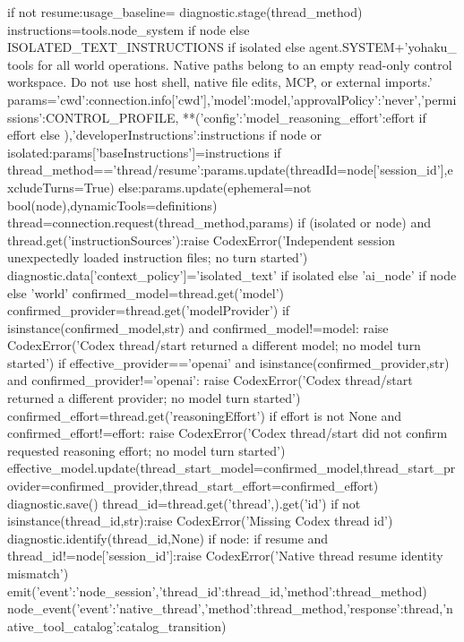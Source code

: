             if not resume:usage_baseline={}
        diagnostic.stage(thread_method)
        instructions=tools.node_system if node else ISOLATED_TEXT_INSTRUCTIONS if isolated else agent.SYSTEM+'\nUse yohaku_ tools for all world operations. Native paths belong to an empty read-only control workspace. Do not use host shell, native file edits, MCP, or external imports.'
        params={'cwd':connection.info['cwd'],'model':model,'approvalPolicy':'never','permissions':CONTROL_PROFILE,
                **({'config':{'model_reasoning_effort':effort}} if effort else {}),'developerInstructions':instructions}
        if node or isolated:params['baseInstructions']=instructions
        if thread_method=='thread/resume':params.update(threadId=node['session_id'],excludeTurns=True)
        else:params.update(ephemeral=not bool(node),dynamicTools=definitions)
        thread=connection.request(thread_method,params)
        if (isolated or node) and thread.get('instructionSources'):raise CodexError('Independent session unexpectedly loaded instruction files; no turn started')
        diagnostic.data['context_policy']='isolated_text' if isolated else 'ai_node' if node else 'world'
        confirmed_model=thread.get('model')
        confirmed_provider=thread.get('modelProvider')
        if isinstance(confirmed_model,str) and confirmed_model!=model:
            raise CodexError('Codex thread/start returned a different model; no model turn started')
        if effective_provider=='openai' and isinstance(confirmed_provider,str) and confirmed_provider!='openai':
            raise CodexError('Codex thread/start returned a different provider; no model turn started')
        confirmed_effort=thread.get('reasoningEffort')
        if effort is not None and confirmed_effort!=effort:
            raise CodexError('Codex thread/start did not confirm requested reasoning effort; no model turn started')
        effective_model.update(thread_start_model=confirmed_model,thread_start_provider=confirmed_provider,thread_start_effort=confirmed_effort)
        diagnostic.save()
        thread_id=thread.get('thread',{}).get('id')
        if not isinstance(thread_id,str):raise CodexError('Missing Codex thread id')
        diagnostic.identify(thread_id,None)
        if node:
            if resume and thread_id!=node['session_id']:raise CodexError('Native thread resume identity mismatch')
            emit({'event':'node_session','thread_id':thread_id,'method':thread_method})
            node_event({'event':'native_thread','method':thread_method,'response':thread,'native_tool_catalog':catalog_transition})
